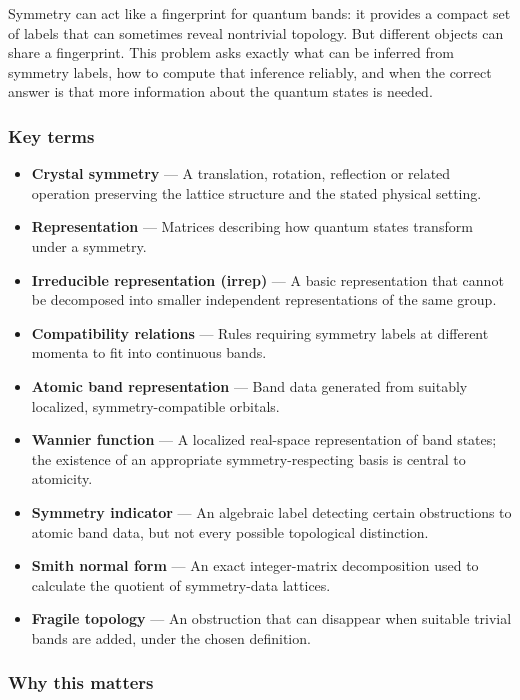 \documentclass[
  11pt,
]{article}
\begin{document}
Symmetry can act like a fingerprint for quantum bands: it provides a
compact set of labels that can sometimes reveal nontrivial topology. But
different objects can share a fingerprint. This problem asks exactly
what can be inferred from symmetry labels, how to compute that inference
reliably, and when the correct answer is that more information about the
quantum states is needed.

\subsubsection{Key terms}

\begin{itemize}
\item
  \textbf{Crystal symmetry} --- A translation, rotation, reflection or
  related operation preserving the lattice structure and the stated
  physical setting.
\item
  \textbf{Representation} --- Matrices describing how quantum states
  transform under a symmetry.
\item
  \textbf{Irreducible representation (irrep)} --- A basic representation
  that cannot be decomposed into smaller independent representations of
  the same group.
\item
  \textbf{Compatibility relations} --- Rules requiring symmetry labels
  at different momenta to fit into continuous bands.
\item
  \textbf{Atomic band representation} --- Band data generated from
  suitably localized, symmetry-compatible orbitals.
\item
  \textbf{Wannier function} --- A localized real-space representation of
  band states; the existence of an appropriate symmetry-respecting basis
  is central to atomicity.
\item
  \textbf{Symmetry indicator} --- An algebraic label detecting certain
  obstructions to atomic band data, but not every possible topological
  distinction.
\item
  \textbf{Smith normal form} --- An exact integer-matrix decomposition
  used to calculate the quotient of symmetry-data lattices.
\item
  \textbf{Fragile topology} --- An obstruction that can disappear when
  suitable trivial bands are added, under the chosen definition.
\end{itemize}

\subsubsection{Why this matters}
\end{document}
